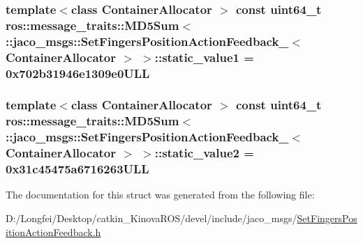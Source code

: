 \subsubsection[{\texorpdfstring{static\+\_\+value1}{static_value1}}]{\setlength{\rightskip}{0pt plus 5cm}template$<$class Container\+Allocator $>$ const uint64\+\_\+t ros\+::message\+\_\+traits\+::\+M\+D5\+Sum$<$ \+::{\bf jaco\+\_\+msgs\+::\+Set\+Fingers\+Position\+Action\+Feedback\+\_\+}$<$ Container\+Allocator $>$ $>$\+::static\+\_\+value1 = 0x702b31946e1309e0\+U\+LL\hspace{0.3cm}{\ttfamily [static]}}\hypertarget{structros_1_1message__traits_1_1MD5Sum_3_01_1_1jaco__msgs_1_1SetFingersPositionActionFeedback___dfd49ff210ac61d84c4dc5e7681b49fc_ad30e05babb5ea67a6d3c6a13725afe39}{}\label{structros_1_1message__traits_1_1MD5Sum_3_01_1_1jaco__msgs_1_1SetFingersPositionActionFeedback___dfd49ff210ac61d84c4dc5e7681b49fc_ad30e05babb5ea67a6d3c6a13725afe39}
\subsubsection[{\texorpdfstring{static\+\_\+value2}{static_value2}}]{\setlength{\rightskip}{0pt plus 5cm}template$<$class Container\+Allocator $>$ const uint64\+\_\+t ros\+::message\+\_\+traits\+::\+M\+D5\+Sum$<$ \+::{\bf jaco\+\_\+msgs\+::\+Set\+Fingers\+Position\+Action\+Feedback\+\_\+}$<$ Container\+Allocator $>$ $>$\+::static\+\_\+value2 = 0x31c45475a6716263\+U\+LL\hspace{0.3cm}{\ttfamily [static]}}\hypertarget{structros_1_1message__traits_1_1MD5Sum_3_01_1_1jaco__msgs_1_1SetFingersPositionActionFeedback___dfd49ff210ac61d84c4dc5e7681b49fc_a4eecf114c86cd5b9f91c48d9d1ae3a7b}{}\label{structros_1_1message__traits_1_1MD5Sum_3_01_1_1jaco__msgs_1_1SetFingersPositionActionFeedback___dfd49ff210ac61d84c4dc5e7681b49fc_a4eecf114c86cd5b9f91c48d9d1ae3a7b}


The documentation for this struct was generated from the following file\+:\begin{DoxyCompactItemize}
\item 
D\+:/\+Longfei/\+Desktop/catkin\+\_\+\+Kinova\+R\+O\+S/devel/include/jaco\+\_\+msgs/\hyperlink{SetFingersPositionActionFeedback_8h}{Set\+Fingers\+Position\+Action\+Feedback.\+h}\end{DoxyCompactItemize}
